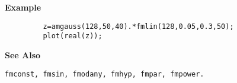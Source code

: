 {\bf \large \sf Example}
\begin{verbatim}
         z=amgauss(128,50,40).*fmlin(128,0.05,0.3,50); 
         plot(real(z));
\end{verbatim}
\vspace*{.5cm}


{\bf \large \sf See Also}\\
\hspace*{1.5cm}
\begin{minipage}[t]{13.5cm}
\begin{verbatim}
fmconst, fmsin, fmodany, fmhyp, fmpar, fmpower.
\end{verbatim}
\end{minipage}

